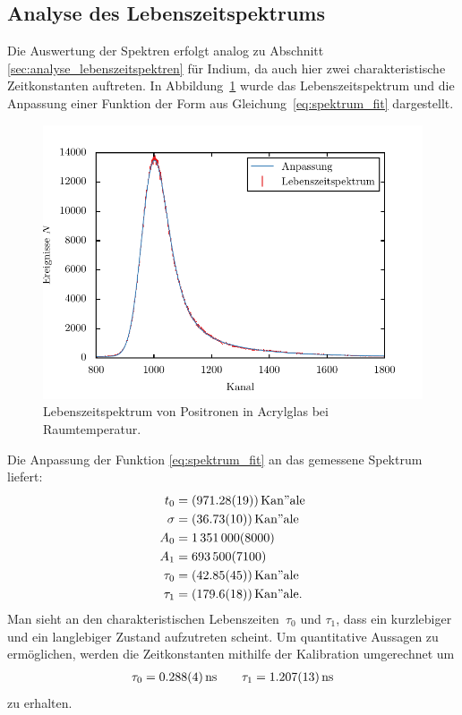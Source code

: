 \documentclass[11pt, a4paper]{article}
\numberwithin{equation}{section}
\begin{document}
\subsection{Analyse des Lebenszeitspektrums}
Die Auswertung der Spektren erfolgt analog zu Abschnitt \ref{sec:analyse_lebenszeitspektren} für Indium, da auch hier zwei charakteristische Zeitkonstanten auftreten.
In Abbildung~\ref{fig:spektrum_acrylglas} wurde das Lebenszeitspektrum und die Anpassung einer Funktion der Form aus Gleichung~\eqref{eq:spektrum_fit} dargestellt.
\begin{figure}[h]
	\centering
	\includegraphics{./figures/acryl_glas.pdf}
	\caption{Lebenszeitspektrum von Positronen in Acrylglas bei Raumtemperatur.}
	\label{fig:spektrum_acrylglas}
\end{figure}

Die Anpassung der Funktion \eqref{eq:spektrum_fit} an das gemessene Spektrum liefert:
\begin{align*}
	t_0 &= (\num{971.28 +- 0.19})\, \mathrm{Kan"ale}\\
	\sigma &= (\num{36.73 +- 0.10})\, \mathrm{Kan"ale}\\
	A_0 &= \num{1351000 +- 8000}\\
	A_1 &= \num{693500 +- 7100}\\
	\tau_0 &= (\num{42.85 +- 0.45})\, \mathrm{Kan"ale}\\
	\tau_1 &= (\num{179.6 +- 1.8})\, \mathrm{Kan"ale} \text{.}
\end{align*}
Man sieht an den charakteristischen Lebenszeiten~$\tau_0$ und $\tau_1$, dass ein kurzlebiger und ein langlebiger Zustand aufzutreten scheint.
Um quantitative Aussagen zu ermöglichen, werden die Zeitkonstanten mithilfe der Kalibration umgerechnet um
\begin{align*}
	\tau_0 = \SI{0.288 +- 0.004}{ns}\qquad
	\tau_1 = \SI{1.207 +- 0.013}{ns}
\end{align*}
zu erhalten.
\end{document}
